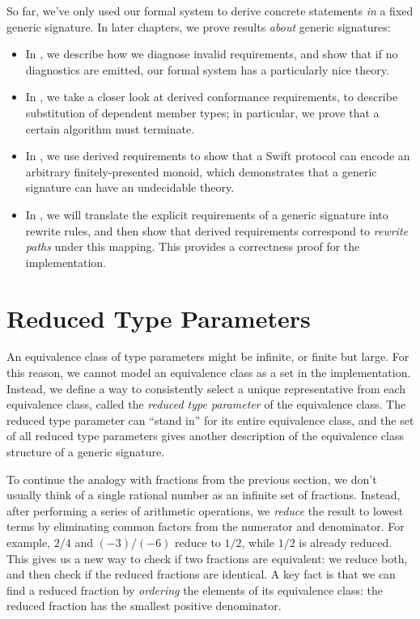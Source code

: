 \documentclass[../generics]{subfiles}
\begin{document}
So far, we've only used our formal system to derive concrete statements \emph{in} a fixed generic signature. In later chapters, we prove results \emph{about} generic signatures:
\begin{itemize}
\item In , we describe how we diagnose invalid requirements, and show that if no diagnostics are emitted, our formal system has a particularly nice theory.
\item In , we take a closer look at derived conformance requirements, to describe substitution of dependent member types; in particular, we prove that a certain algorithm must terminate.
\item In , we use derived requirements to show that a Swift protocol can encode an arbitrary finitely-presented monoid, which demonstrates that a generic signature can have an undecidable theory.
\item In , we will translate the explicit requirements of a generic signature into rewrite rules, and then show that derived requirements correspond to \emph{rewrite paths} under this mapping. This provides a correctness proof for the implementation.
\end{itemize}

\section{Reduced Type Parameters}\label{reduced types}

An equivalence class of type parameters might be infinite, or finite but large. For this reason, we cannot model an equivalence class as a set in the implementation. Instead, we define a way to consistently select a unique representative from each equivalence class, called the \emph{reduced type parameter} of the equivalence class. The reduced type parameter can ``stand in'' for its entire equivalence class, and the set of all reduced type parameters gives another description of the equivalence class structure of a generic signature.

To continue the analogy with fractions from the previous section, we don't usually think of a single rational number as an infinite set of fractions. Instead, after performing a series of arithmetic operations, we \emph{reduce} the result to lowest terms by eliminating common factors from the numerator and denominator. For example, $2/4$ and $(-3)/(-6)$ reduce to $1/2$, while $1/2$ is already reduced. This gives us a new way to check if two fractions are equivalent: we reduce both, and then check if the reduced fractions are identical. A key fact is that we can find a reduced fraction by \emph{ordering} the elements of its equivalence class: the reduced fraction has the smallest positive denominator.
\end{document}
